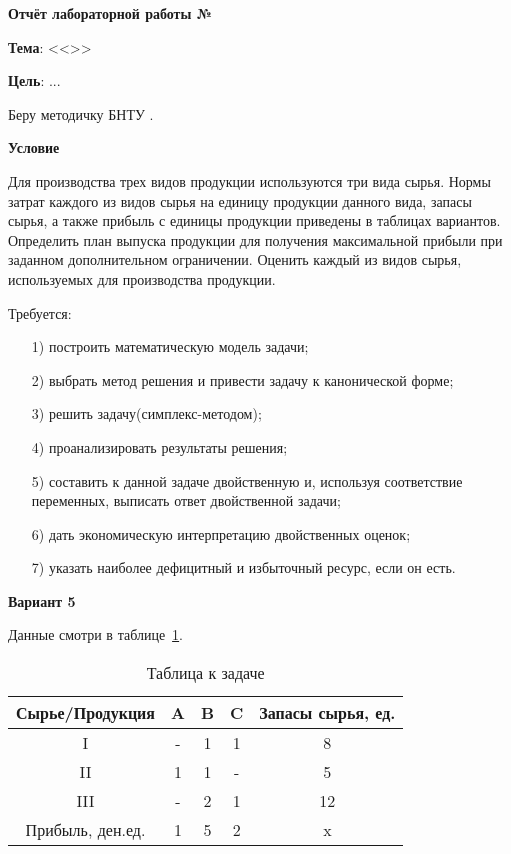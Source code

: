\begin{center}
  \textbf{Отчёт лабораторной работы №\envReportLabNumber}
\end{center}

\textbf{Тема}:
<<\envReportTitle>>

\textbf{Цель}: ...


Беру методичку БНТУ \cite{MethodBntu}.

\begin{center}
  \textbf{Условие}
\end{center}

Для производства трех видов продукции используются три вида сырья.
Нормы затрат каждого из видов сырья на единицу продукции данного вида, запасы сырья,
а также прибыль с единицы продукции приведены в таблицах вариантов.
Определить план выпуска продукции для получения максимальной прибыли при заданном дополнительном ограничении.
Оценить каждый из видов сырья, используемых для производства продукции.

Требуется:

\begin{enumerate}
  \item[1)] построить математическую модель задачи;
  \item[2)] выбрать метод решения и привести задачу к канонической форме;
  \item[3)] решить задачу(симплекс-методом);
  \item[4)] проанализировать результаты решения;
  \item[5)] составить к данной задаче двойственную и, используя соответствие перемен­ных, выписать ответ двойственной задачи;
  \item[6)] дать экономическую интерпретацию двойственных оценок;
  \item[7)] указать наиболее дефицитный и избыточный ресурс, если он есть.
\end{enumerate}

\begin{center}
  \textbf{Вариант 5}
\end{center}

Данные смотри в таблице~\ref{tab:1}.

\begin{table}[h!]

  \centering

  \caption{Таблица к задаче}
  \label{tab:1}

  \begin{tabular}{|c||c|c|c||c|} 
    \hline
    Сырье/Продукция &A  &B  &C  &Запасы сырья, ед. \\ \hline
    \hline
    I               &-  &1  &1  &8  \\  \hline
    II              &1  &1  &-  &5  \\  \hline
    III             &-  &2  &1  &12 \\  \hline
    \hline
    Прибыль, ден.ед.&1  &5  &2  &x  \\  \hline
  \end{tabular}
\end{table}

